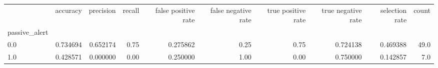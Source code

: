 \begin{tabular}{lrrrrrrrrr}
\toprule
{} &  accuracy &  precision &  recall &  false positive rate &  false negative rate &  true positive rate &  true negative rate &  selection rate &  count \\
passive\_alert &           &            &         &                      &                      &                     &                     &                 &        \\
\midrule
0.0           &  0.734694 &   0.652174 &    0.75 &             0.275862 &                 0.25 &                0.75 &            0.724138 &        0.469388 &   49.0 \\
1.0           &  0.428571 &   0.000000 &    0.00 &             0.250000 &                 1.00 &                0.00 &            0.750000 &        0.142857 &    7.0 \\
\bottomrule
\end{tabular}
